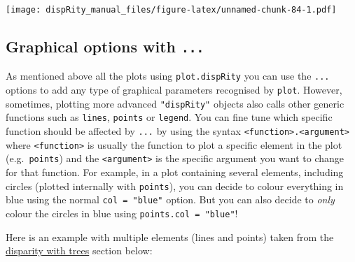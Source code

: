 \documentclass[
]{book}
\begin{document}
\texttt{[image: dispRity\_manual\_files/figure-latex/unnamed-chunk-84-1.pdf]}

\hypertarget{graphical-options-with-...}{%
\subsection{\texorpdfstring{Graphical options with \texttt{...}}{Graphical options with ...}}\label{graphical-options-with-...}}

As mentioned above all the plots using \texttt{plot.dispRity} you can use the \texttt{...} options to add any type of graphical parameters recognised by \texttt{plot}.
However, sometimes, plotting more advanced \texttt{"dispRity"} objects also calls other generic functions such as \texttt{lines}, \texttt{points} or \texttt{legend}.
You can fine tune which specific function should be affected by \texttt{...} by using the syntax \texttt{\textless{}function\textgreater{}.\textless{}argument\textgreater{}} where \texttt{\textless{}function\textgreater{}} is usually the function to plot a specific element in the plot (e.g.~\texttt{points}) and the \texttt{\textless{}argument\textgreater{}} is the specific argument you want to change for that function.
For example, in a plot containing several elements, including circles (plotted internally with \texttt{points}), you can decide to colour everything in blue using the normal \texttt{col\ =\ "blue"} option.
But you can also decide to \emph{only} colour the circles in blue using \texttt{points.col\ =\ "blue"}!

Here is an example with multiple elements (lines and points) taken from the \protect\hyperlink{dispRitree}{disparity with trees} section below:
\end{document}
